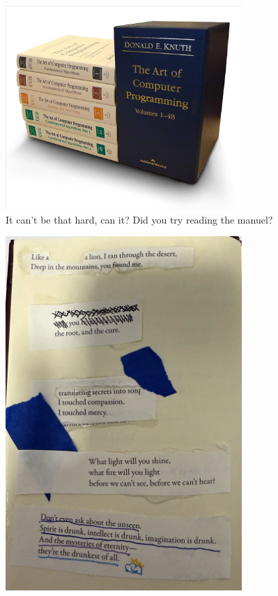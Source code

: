 \documentclass[12pt]{book}
\begin{document}
\begin{figure}
    \centering
    \includegraphics[width=0.8\textwidth]{figures/aocp.jpg}
    \caption{It can't be that hard, can it? Did you try reading the manuel? \cite{eulerarchive}}
\end{figure}

\begin{figure}
    \centering
    \includegraphics[width=0.8\textwidth]{figures/rumi_gold.png}
    \caption{\cite{gafori}}
\end{figure}
\end{document}
